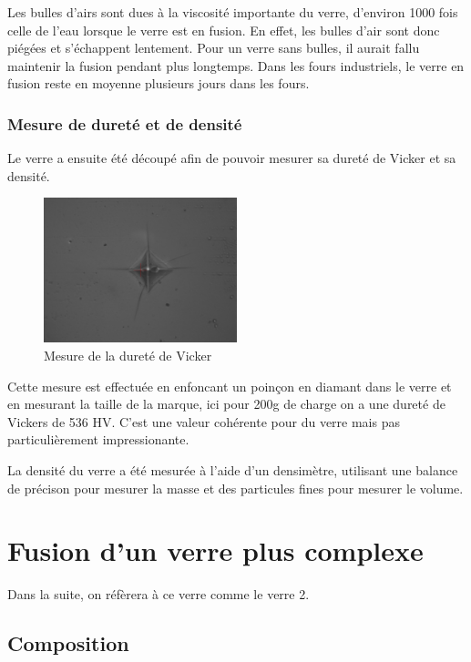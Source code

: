 \documentclass{article}
\begin{document}
Les bulles d'airs sont dues à la viscosité importante du verre, d'environ 1000 fois celle de l'eau lorsque le verre est en fusion. En effet, les bulles d'air sont donc piégées et s'échappent lentement. Pour un verre sans bulles, il aurait fallu maintenir la fusion pendant plus longtemps. Dans les fours industriels, le verre en fusion reste en moyenne plusieurs jours dans les fours.

\subsubsection{Mesure de dureté et de densité}

Le verre a ensuite été découpé afin de pouvoir mesurer sa dureté de Vicker et sa densité. 


\begin{figure}[h]
    \centering
    \includegraphics[width=0.5\textwidth]{photos/dureté.jpg}
    \caption{Mesure de la dureté de Vicker}
\end{figure}

Cette mesure est effectuée en enfoncant un poinçon en diamant dans le verre et en mesurant la taille de la marque, ici pour 200g de charge on a une dureté de Vickers de 536 HV. C'est une valeur cohérente pour du verre mais pas particulièrement impressionante.


La densité du verre a été mesurée à l'aide d'un densimètre, utilisant une balance de précison pour mesurer la masse et des particules fines pour mesurer le volume. 

\section{Fusion d'un verre plus complexe}
Dans la suite, on réfèrera à ce verre comme le verre 2.

\subsection{Composition}
\end{document}
